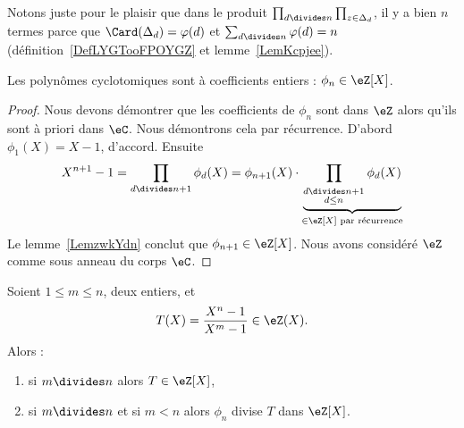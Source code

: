 \begin{remark}
	Notons juste pour le plaisir que dans le produit \( \prod_{d\divides n}\prod_{z\in\Delta_d}\), il y a bien \( n\) termes parce que \( \Card(\Delta_d)=\varphi(d)\) et \( \sum_{d\divides n}\varphi(d)=n\) (définition~\ref{DefLYGTooFPOYGZ} et lemme~\ref{LemKcpjee}).
\end{remark}

\begin{proposition}
	Les polynômes cyclotomiques sont à coefficients entiers : \( \phi_n\in \eZ[X]\).
\end{proposition}

\begin{proof}
	Nous devons démontrer que les coefficients de \( \phi_n\) sont dans \( \eZ\) alors qu'ils sont à priori dans \( \eC\). Nous démontrons cela par récurrence. D'abord \( \phi_1(X)=X-1\), d'accord. Ensuite
	\begin{equation}
		X^{n+1}-1=\prod_{d\divides n+1}\phi_d(X)=\phi_{n+1}(X)\cdot\underbrace{\prod_{_{\substack{d\divides n+1\\d\leq n}}}\phi_d(X)}_{\in\eZ[X]\text{ par récurrence}}
	\end{equation}
	Le lemme~\ref{LemzwkYdn} conclut que \( \phi_{n+1}\in \eZ[X]\). Nous avons considéré \( \eZ\) comme sous anneau du corps \( \eC\).
\end{proof}

\begin{proposition}     \label{PropUImYnL}
	Soient \( 1\leq m\leq n\), deux entiers, et
	\begin{equation}
		T(X)=\frac{ X^n-1 }{ X^m-1 }\in \eZ(X).
	\end{equation}
	Alors :
	\begin{enumerate}
		\item   \label{ItemhpDPKE}
		      si \( m\divides n\) alors \( T\in \eZ[X]\),
		\item
		      si \( m\divides n\) et si \( m<n\) alors \( \phi_n\) divise \( T\) dans \( \eZ[X]\).
	\end{enumerate}
\end{proposition}

